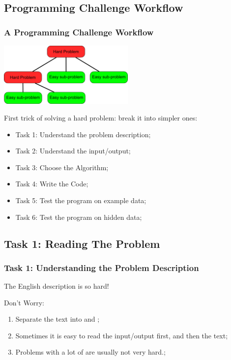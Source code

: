 \documentclass{beamer}
\begin{document}
\subsection{Programming Challenge Workflow}
\begin{frame}
  \frametitle{A Programming Challenge Workflow}

  \begin{center}
    \includegraphics[width=0.5\textwidth]{../img/breakingtheproblem}
  \end{center}

  First trick of solving a hard problem: break it into simpler ones:
  
  {\smaller
  \begin{itemize}
  \item Task 1: Understand the problem description;
  \item Task 2: Understand the input/output;
  \item Task 3: Choose the Algorithm;
  \item Task 4: Write the Code;
  \item Task 5: Test the program on example data;
  \item Task 6: Test the program on hidden data;
  \end{itemize}}
\end{frame}

\subsection{Task 1: Reading The Problem}
\begin{frame}
  \frametitle{Task 1: Understanding the Problem Description}

  The English description is so hard!
  
  \bigskip

  \begin{block}{Don't Worry:}
  \begin{enumerate}
  \item Separate the text into  and ;
  \item Sometimes it is easy to read the input/output first, and then
    the text;    
  \item Problems with a lot of  are usually not very hard.;
  \end{enumerate}
  \end{block}
\end{frame}
\end{document}
